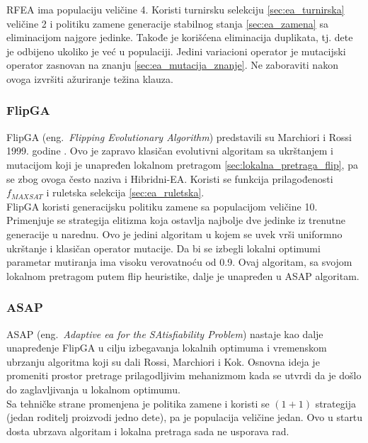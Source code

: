 \documentclass{article}
\begin{document}
RFEA ima populaciju veličine 4. Koristi turnirsku selekciju \ref{sec:ea_turnirska} veličine 2 i politiku zamene generacije stabilnog stanja \ref{sec:ea_zamena} sa eliminacijom najgore jedinke. Takođe je korišćena eliminacija duplikata, tj. dete je odbijeno ukoliko je već u populaciji.
Jedini variacioni operator je mutacijski operator zasnovan na znanju \ref{sec:ea_mutacija_znanje}.
Ne zaboraviti nakon ovoga izvršiti ažuriranje težina klauza.



\subsubsection{FlipGA}
\label{sec:ea_flipga}
FlipGA (eng.~{\em Flipping Evolutionary Algorithm}) predstavili su Marchiori i Rossi 1999.
godine \cite{MaRos99_flipGA, ea_with_table}. Ovo je zapravo klasičan evolutivni algoritam
sa ukrštanjem i mutacijom koji je unapređen lokalnom pretragom 
\ref{sec:lokalna_pretraga_flip}, pa se zbog ovoga često naziva i Hibridni-EA. 
Koristi se funkcija prilagođenosti $f_{MAXSAT}$ i ruletska selekcija \ref{sec:ea_ruletska}.\\

FlipGA koristi generacijsku politiku zamene sa populacijom veličine 10.
Primenjuje se strategija elitizma koja ostavlja najbolje dve jedinke iz trenutne generacije 
u narednu. Ovo je jedini algoritam u kojem se uvek vrši uniformno ukrštanje i klasičan operator mutacije. Da bi se izbegli lokalni optimumi parametar mutiranja 
ima visoku verovatnoću od 0.9. 
Ovaj algoritam, sa svojom lokalnom pretragom putem flip heuristike,
dalje je unapređen u ASAP algoritam.


\subsubsection{ASAP}
\label{sec:ea_asap}
ASAP (eng.~{\em Adaptive ea for the SAtisfi­ability Problem}) \cite{adaptiveEA, ea_with_table} nastaje kao dalje unapređenje FlipGA u cilju izbegavanja lokalnih optimuma
i vremenskom ubrzanju algoritma koji su dali Rossi, Marchiori i Kok. 
Osnovna ideja je promeniti prostor pretrage prilagodljivim mehanizmom 
kada se utvrdi da je došlo do zaglavljivanja u lokalnom optimumu. \\


Sa tehničke strane promenjena je politika zamene i koristi se $(1+1)$ strategija 
(jedan roditelj proizvodi jedno dete), pa je populacija veličine jedan. Ovo u startu dosta
ubrzava algoritam i lokalna pretraga sada ne usporava rad.\\
\end{document}
